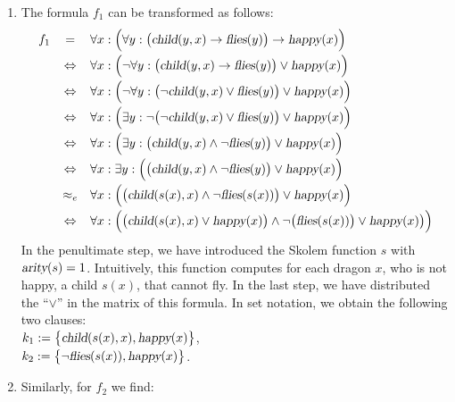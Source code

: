 \begin{enumerate}
\item The formula $f_1$ can be transformed as follows:
 $$ 
  \begin{array}{lcl}
    f_1 & =           & \forall x:\Bigl(\forall y: \big(\textsl{child}(y,x)
    \rightarrow \textsl{flies}(y)\big) \rightarrow \textsl{happy}(x) \Bigr) \\[0.2cm]
    &\Leftrightarrow & \forall x: \Bigl(\neg \forall y: \big( \textsl{child}(y,x) \rightarrow \textsl{flies}(y)\big) \vee \textsl{happy}(x) \Bigr)\\[0.2cm]
    &\Leftrightarrow & \forall x: \Bigl(\neg \forall y: \big( \neg \textsl{child}(y,x) \vee \textsl{flies}(y)\big) \vee \textsl{happy}(x) \Bigr)\\[0.2cm]
    &\Leftrightarrow & \forall x: \Bigl(\exists y: \neg \big( \neg \textsl{child}(y,x) \vee \textsl{flies}(y)\big) \vee \textsl{happy}(x) \Bigr)\\[0.2cm]
    &\Leftrightarrow & \forall x: \Bigl( \exists y: \big(\textsl{child}(y,x) \wedge \neg  \textsl{flies}(y)\big) \vee \textsl{happy}(x) \Bigr)\\[0.2cm]
    &\Leftrightarrow & \forall x:  \exists y: \Bigl(\big( \textsl{child}(y,x) \wedge \neg  \textsl{flies}(y)\big) \vee \textsl{happy}(x) \Bigr)\\[0.2cm]
    &\approx_e & \forall x: \Bigl(\big( \textsl{child}(s(x),x) \wedge \neg  \textsl{flies}(s(x))\big) \vee
                 \textsl{happy}(x) \Bigr)\\[0.2cm]
    &\Leftrightarrow & \forall x: \Bigl(\big( \textsl{child}(s(x),x) \vee \textsl{happy}(x)\bigr) \wedge \neg  \bigl(\textsl{flies}(s(x))\big) \vee \textsl{happy}(x)\bigr) \Bigr)
  \end{array}
     $$
      In the penultimate step, we have introduced the Skolem function $s$ with 
      $\textsl{arity}(s) = 1$. Intuitively, this function computes for each
      dragon $x$, who is not happy, a child $s(x)$, that cannot fly.
      In the last step, we have distributed the ``$\vee$'' in the matrix of this formula.
      In set notation, we obtain the following two clauses:
      \\[0.2cm]
      \hspace*{1.3cm} $k_1 := \bigl\{ \textsl{child}(s(x),x), \textsl{happy}(x) \bigl\}$,   \\[0.2cm]
      \hspace*{1.3cm} $k_2 := \bigl\{ \neg \textsl{flies}(s(x)), \textsl{happy}(x) \bigl\}$. 
\item Similarly, for $f_2$ we find:

\end{enumerate}
